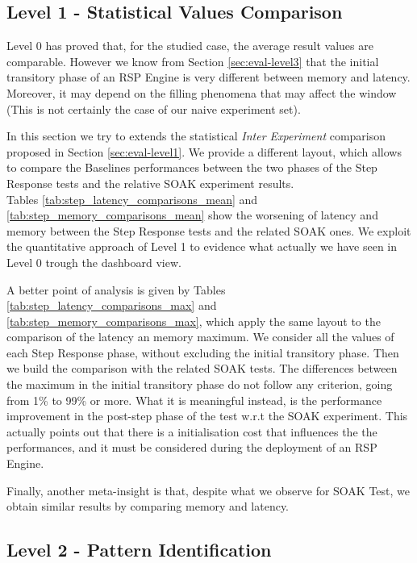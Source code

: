 \subsection{Level 1 - Statistical Values Comparison}\label{sec:level1-step-stats}

Level 0 has proved that, for the studied case, the average result values are comparable. However we know from Section \ref{sec:eval-level3} that the initial transitory phase of an RSP Engine is very different between memory and latency. Moreover, it may depend on the filling phenomena that may affect the window (This is not certainly the case of our naive experiment set).

In this section we try to extends the statistical \textit{Inter Experiment} comparison proposed in Section \ref{sec:eval-level1}. We provide a different layout, which allows to compare the Baselines performances between the two phases of the Step Response tests and the relative SOAK experiment results.\\

Tables \ref{tab:step_latency_comparisons_mean} and \ref{tab:step_memory_comparisons_mean} show the worsening of latency and memory between the Step Response tests and the related SOAK ones. We exploit the quantitative approach of Level 1 to evidence what actually we have seen in Level 0 trough the dashboard view.

A better point of analysis is given by Tables \ref{tab:step_latency_comparisons_max} and \ref{tab:step_memory_comparisons_max}, which apply the same layout to the comparison of the latency an memory maximum. We consider all the values of each Step Response phase, without excluding the initial transitory phase. Then we build the comparison with the related SOAK tests. The differences between the maximum in the initial transitory phase do not follow any criterion, going from 1\% to 99\% or more. What it is meaningful instead, is the performance improvement in the post-step phase of the test w.r.t the SOAK experiment. This actually points out that there is a initialisation cost that influences the the performances, and it must be considered during the deployment of an RSP Engine.

Finally, another meta-insight is that, despite what we observe for SOAK Test, we obtain similar results by comparing memory and latency.



\pagebreak

\subsection{Level 2 - Pattern Identification}\label{sec:level2-step-pattern}

